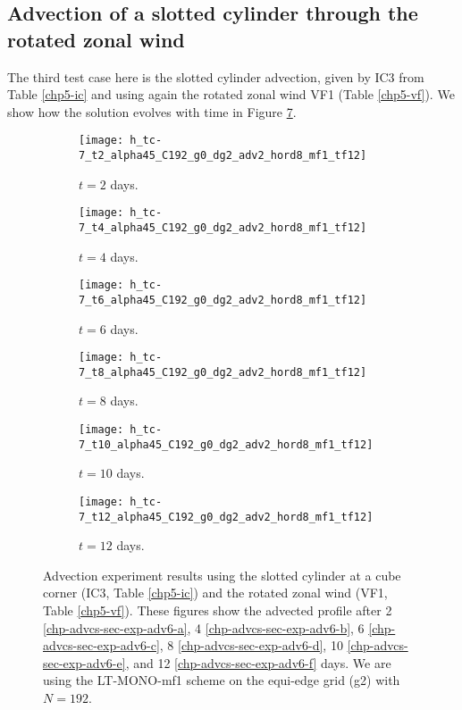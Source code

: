 \newpage
\subsection{Advection of a slotted cylinder through the rotated zonal wind}
The third test case here is the slotted cylinder advection, given by IC3 from Table \ref{chp5-ic} and using again the rotated zonal wind VF1 (Table \ref{chp5-vf}).
We show how the solution evolves with time in Figure \ref{chp-advcs-sec-exp-adv6}.

\begin{figure}[!htb]
	\centering
	\begin{subfigure}{0.45\textwidth}
		\centering
		\texttt{[image: h\_tc-7\_t2\_alpha45\_C192\_g0\_dg2\_adv2\_hord8\_mf1\_tf12]}
		\caption{$t=2$ days.\label{chp-advcs-sec-exp-adv6-a}}
	\end{subfigure}
	\begin{subfigure}{0.45\textwidth}
		\centering
		\texttt{[image: h\_tc-7\_t4\_alpha45\_C192\_g0\_dg2\_adv2\_hord8\_mf1\_tf12]}
		\caption{$t=4$ days.\label{chp-advcs-sec-exp-adv6-b}}
	\end{subfigure}
	
	\begin{subfigure}{0.45\textwidth}
		\centering
		\texttt{[image: h\_tc-7\_t6\_alpha45\_C192\_g0\_dg2\_adv2\_hord8\_mf1\_tf12]}
		\caption{$t=6$ days.\label{chp-advcs-sec-exp-adv6-c}}
	\end{subfigure}	
	\begin{subfigure}{0.45\textwidth}
		\centering
		\texttt{[image: h\_tc-7\_t8\_alpha45\_C192\_g0\_dg2\_adv2\_hord8\_mf1\_tf12]}
		\caption{$t=8$ days.\label{chp-advcs-sec-exp-adv6-d}}
	\end{subfigure}
	
	\begin{subfigure}{0.45\textwidth}
		\centering
		\texttt{[image: h\_tc-7\_t10\_alpha45\_C192\_g0\_dg2\_adv2\_hord8\_mf1\_tf12]}
		\caption{$t=10$ days.\label{chp-advcs-sec-exp-adv6-e}}
	\end{subfigure}
	\begin{subfigure}{0.45\textwidth}
		\centering
		\texttt{[image: h\_tc-7\_t12\_alpha45\_C192\_g0\_dg2\_adv2\_hord8\_mf1\_tf12]}
		\caption{$t=12$ days.\label{chp-advcs-sec-exp-adv6-f}}
	\end{subfigure}
	\caption{Advection experiment results using the slotted cylinder at a cube corner (IC3, Table \ref{chp5-ic}) and 
		the rotated zonal wind (VF1, Table \ref{chp5-vf}).
		These figures show the advected profile after
		2 \eqref{chp-advcs-sec-exp-adv6-a}, 
		4  \eqref{chp-advcs-sec-exp-adv6-b},
		6  \eqref{chp-advcs-sec-exp-adv6-c},
		8  \eqref{chp-advcs-sec-exp-adv6-d},
		10  \eqref{chp-advcs-sec-exp-adv6-e},
		and 12  \eqref{chp-advcs-sec-exp-adv6-f} days.
		We are using the LT-MONO-mf1 scheme on the equi-edge grid (g2) with $N=192$. \label{chp-advcs-sec-exp-adv6}}
\end{figure}

